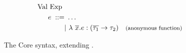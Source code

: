 \begin{figure}[htb]
\begin{align*}
\begin{aligned}
\text{Val Exp } \\
e \; ::= &\ \ldots \\
&|\ \lambda\ \overline{x}.e:(\overline{\tau_{1}}\rightarrow\tau_{2}) & \footnotesize\text{(anonymous function)}
\end{aligned}
\end{align*}
\caption[Extended Core Syntax]{The Core syntax, extending .\label{fig:UpdatedCoreSyntax}}
\end{figure}